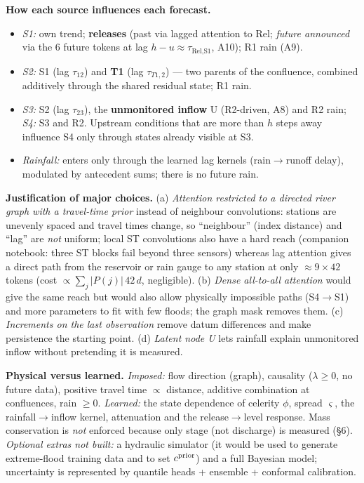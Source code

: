 \noindent\textbf{How each source influences each forecast.}
\begin{itemize}[leftmargin=*,itemsep=1pt,topsep=2pt]
\item \emph{S1:} own trend; \textbf{releases} (past via lagged attention to Rel; \emph{future announced} via the 6 future tokens at lag $h{-}u\approx\tau_{\text{Rel,S1}}$, A10); R1 rain (A9).
\item \emph{S2:} S1 (lag $\tau_{12}$) and \textbf{T1} (lag $\tau_{T1,2}$) --- two parents of the confluence, combined additively through the shared residual state; R1 rain.
\item \emph{S3:} S2 (lag $\tau_{23}$), the \textbf{unmonitored inflow} U (R2-driven, A8) and R2 rain; \emph{S4:} S3 and R2. Upstream conditions that are more than $h$ steps away influence S4 only through states already visible at S3.
\item \emph{Rainfall:} enters only through the learned lag kernels (rain$\to$runoff delay), modulated by antecedent sums; there is no future rain.
\end{itemize}
\textbf{Justification of major choices.} (a) \emph{Attention restricted to a directed river graph with a travel-time prior} instead of neighbour convolutions: stations are unevenly spaced and travel times change, so ``neighbour'' (index distance) and ``lag'' are \emph{not} uniform; local ST convolutions also have a hard reach (companion notebook: three ST blocks fail beyond three sensors) whereas lag attention gives a direct path from the reservoir or rain gauge to any station at only $\approx9\times42$ tokens (cost $\propto\sum_j|P(j)|\,42\,d$, negligible). (b) \emph{Dense all-to-all attention} would give the same reach but would also allow physically impossible paths (S4$\to$S1) and more parameters to fit with few floods; the graph mask removes them. (c) \emph{Increments on the last observation} remove datum differences and make persistence the starting point. (d) \emph{Latent node U} lets rainfall explain unmonitored inflow without pretending it is measured.

\noindent\textbf{Physical versus learned.} \emph{Imposed:} flow direction (graph), causality ($\lambda{\ge}0$, no future data), positive travel time $\propto$ distance, additive combination at confluences, rain $\ge0$. \emph{Learned:} the state dependence of celerity $\phi$, spread $\varsigma$, the rainfall$\to$inflow kernel, attenuation and the release$\to$level response. Mass conservation is \emph{not} enforced because only stage (not discharge) is measured (\S6). \emph{Optional extras not built:} a hydraulic simulator (it would be used to generate extreme-flood training data and to set $c^{\rm prior}$) and a full Bayesian model; uncertainty is represented by quantile heads + ensemble + conformal calibration.

